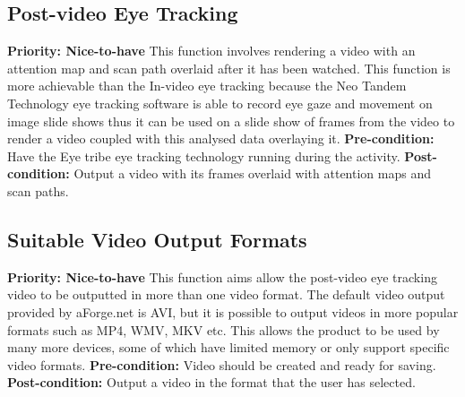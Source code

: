 \subsection{Post-video Eye Tracking}
    \textbf{Priority: Nice-to-have}\newline
    This function involves rendering a video with an attention map and scan path overlaid after it has been watched. This function is more achievable than the In-video eye tracking because the Neo Tandem Technology eye tracking software is able to record eye gaze and movement on image slide shows thus it can be used on a slide show of frames from the video to render a video coupled with this analysed data overlaying it.\newline
\textbf{Pre-condition: }Have the Eye tribe eye tracking technology running during the activity.\newline   
\textbf{Post-condition: }Output a video with its frames overlaid with attention maps and scan paths.

\subsection{Suitable Video Output Formats} 
    \textbf{Priority: Nice-to-have}\newline
    This function aims allow the post-video eye tracking video to be outputted in more than one video format. The default video output provided by aForge.net is AVI, but it is possible to output videos in more popular formats such as MP4, WMV, MKV etc. This allows the product to be used by many more devices, some of which have limited memory or only support specific video formats.\newline
    \textbf{Pre-condition: } Video should be created and ready for saving.\newline
    \textbf{Post-condition: }Output a video in the format that the user has selected.
